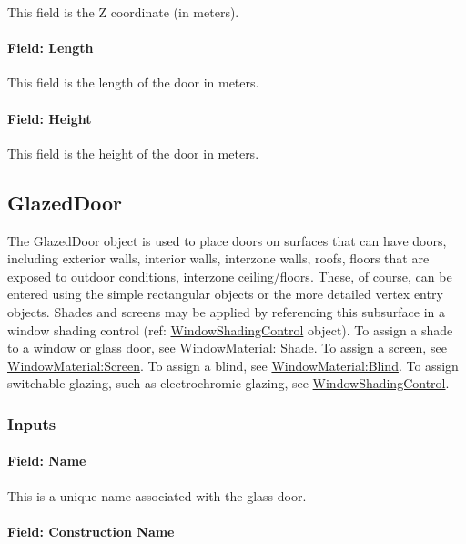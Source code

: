 This field is the Z coordinate (in meters).

\paragraph{Field: Length}\label{field-length-11}

This field is the length of the door in meters.

\paragraph{Field: Height}\label{field-height-5}

This field is the height of the door in meters.

\subsection{GlazedDoor}\label{glazeddoor}

The GlazedDoor object is used to place doors on surfaces that can have doors, including exterior walls, interior walls, interzone walls, roofs, floors that are exposed to outdoor conditions, interzone ceiling/floors. These, of course, can be entered using the simple rectangular objects or the more detailed vertex entry objects. Shades and screens may be applied by referencing this subsurface in a window shading control (ref: \hyperref[windowpropertyshadingcontrol]{WindowShadingControl} object). To assign a shade to a window or glass door, see WindowMaterial: Shade. To assign a screen, see \hyperref[windowmaterialscreen]{WindowMaterial:Screen}. To assign a blind, see \hyperref[windowmaterialblind]{WindowMaterial:Blind}. To assign switchable glazing, such as electrochromic glazing, see \hyperref[windowpropertyshadingcontrol]{WindowShadingControl}.

\subsubsection{Inputs}\label{inputs-16-012}

\paragraph{Field: Name}\label{field-name-12-012}

This is a unique name associated with the glass door.

\paragraph{Field: Construction Name}\label{field-construction-name-12}

